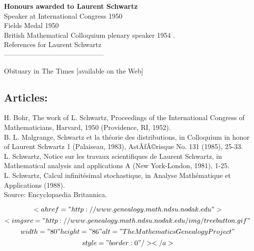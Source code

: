 \documentclass[12pt]{article}
\theoremstyle{plain}
\theoremstyle{definition}
\numberwithin{equation}{section}
\begin{document}
{\bf Honours awarded to Laurent Schwartz} \\
 
Speaker at International Congress 1950  \\
Fields Medal 1950  \\
British Mathematical Colloquium plenary speaker 1954 . \\

References for Laurent Schwartz\\
--------------------------------------------

Obituary in The Times [available on the Web] \\
\subsection{Articles:}
\bigbreak
H. Bohr, The work of L. Schwartz, Proceedings of the International Congress of Mathematicians, Harvard, 1950 (Providence, RI, 1952). \\
B. L. Malgrange, Schwartz et la th\'eorie des distributions, in Colloquium in honor of Laurent Schwartz 1 (Palaiseau, 1983), AstÃƒÂ©risque No. 131 (1985), 25-33. \\
L. Schwartz, Notice sur les travaux scientifiques de Laurent Schwartz, in Mathematical analysis and applications A (New York-London, 1981), 1-25. \\
L. Schwartz, Calcul infinit\'esimal stochastique, in Analyse Math\'ematique et Applications (1988). \\

Source: Encyclopaedia Britannica.


$$<a href="http://www.genealogy.math.ndsu.nodak.edu">$$
$$<img src="http://www.genealogy.math.ndsu.nodak.edu/img/treebutton.gif"$$
$$width="80" height="86" alt="The Mathematics Genealogy Project"$$
$$style="border: 0" /></a>$$
\end{document}

